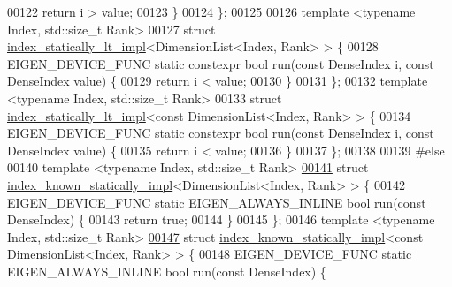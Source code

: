 \begin{DoxyCode}
00122     \textcolor{keywordflow}{return} i > value;
00123   \}
00124 \};
00125 
00126 \textcolor{keyword}{template} <\textcolor{keyword}{typename} Index, std::\textcolor{keywordtype}{size\_t} Rank>
00127 \textcolor{keyword}{struct }\hyperlink{struct_eigen_1_1internal_1_1index__statically__lt__impl}{index\_statically\_lt\_impl}<DimensionList<Index, Rank> > \{
00128   EIGEN\_DEVICE\_FUNC \textcolor{keyword}{static} constexpr \textcolor{keywordtype}{bool} run(\textcolor{keyword}{const} DenseIndex i, \textcolor{keyword}{const} DenseIndex value) \{
00129     \textcolor{keywordflow}{return} i < value;
00130   \}
00131 \};
00132 \textcolor{keyword}{template} <\textcolor{keyword}{typename} Index, std::\textcolor{keywordtype}{size\_t} Rank>
00133 \textcolor{keyword}{struct }\hyperlink{struct_eigen_1_1internal_1_1index__statically__lt__impl}{index\_statically\_lt\_impl}<const DimensionList<Index, Rank> > \{
00134   EIGEN\_DEVICE\_FUNC \textcolor{keyword}{static} constexpr \textcolor{keywordtype}{bool} run(\textcolor{keyword}{const} DenseIndex i, \textcolor{keyword}{const} DenseIndex value) \{
00135     \textcolor{keywordflow}{return} i < value;
00136   \}
00137 \};
00138 
00139 \textcolor{preprocessor}{#else}
00140 \textcolor{keyword}{template} <\textcolor{keyword}{typename} Index, std::\textcolor{keywordtype}{size\_t} Rank>
\hyperlink{struct_eigen_1_1internal_1_1index__known__statically__impl_3_01_dimension_list_3_01_index_00_01_rank_01_4_01_4}{00141} \textcolor{keyword}{struct }\hyperlink{struct_eigen_1_1internal_1_1index__known__statically__impl}{index\_known\_statically\_impl}<DimensionList<Index, Rank> > \{
00142   EIGEN\_DEVICE\_FUNC \textcolor{keyword}{static} EIGEN\_ALWAYS\_INLINE \textcolor{keywordtype}{bool} run(\textcolor{keyword}{const} DenseIndex) \{
00143     \textcolor{keywordflow}{return} \textcolor{keyword}{true};
00144   \}
00145 \};
00146 \textcolor{keyword}{template} <\textcolor{keyword}{typename} Index, std::\textcolor{keywordtype}{size\_t} Rank>
\hyperlink{struct_eigen_1_1internal_1_1index__known__statically__impl_3_01const_01_dimension_list_3_01_index_00_01_rank_01_4_01_4}{00147} \textcolor{keyword}{struct }\hyperlink{struct_eigen_1_1internal_1_1index__known__statically__impl}{index\_known\_statically\_impl}<const DimensionList<Index, Rank> > \{
00148   EIGEN\_DEVICE\_FUNC \textcolor{keyword}{static} EIGEN\_ALWAYS\_INLINE \textcolor{keywordtype}{bool} run(\textcolor{keyword}{const} DenseIndex) \{

\end{DoxyCode}
